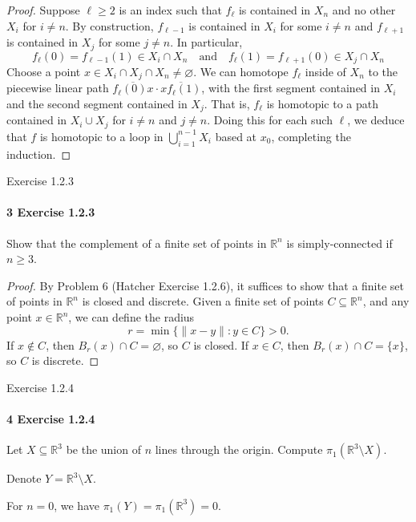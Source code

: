 \documentclass[12pt]{article}
\newlength{\myparskip}
\newenvironment{fullbox}{\begin{lrbox}{\savefullbox}\begin{minipage}{\dimexpr\textwidth-2\fboxsep\relax}\setlength{\parskip}{\myparskip}}{\end{minipage}\end{lrbox}\framebox[\textwidth]{\usebox{\savefullbox}}}
\newenvironment{pbox}[1][]{\begin{fullbox}\ifx#1\empty\else\paragraph{#1}\phantom{}\fi}{\end{fullbox}}
\theoremstyle{definition}
\newcommand{\isp}[1]{\quad\text{#1}\quad}
\newcommand{\R}{\mathbb{R}}
\renewcommand{\emptyset}{\varnothing}
\newcommand{\<}{\langle}
\renewcommand{\>}{\rangle}
\newcommand{\seq}{\subseteq}
\newcommand{\ovl}{\overline}
\begin{document}
\begin{proof}
    Suppose $\ell \geq 2$ is an index such that $f_\ell$ is contained in $X_n$ and no other $X_i$ for $i \ne n$.
    By construction, $f_{\ell-1}$ is contained in $X_i$ for some $i \ne n$ and $f_{\ell+1}$ is contained in $X_j$ for some $j \ne n$.
    In particular,
    \[
        f_\ell(0) = f_{\ell-1}(1) \in X_i \cap X_n \isp{and} f_\ell(1) = f_{\ell+1}(0) \in X_j \cap X_n
    \]
    Choose a point $x \in X_i \cap X_j \cap X_n \ne \emptyset$.
    We can homotope $f_\ell$ inside of $X_n$ to the piecewise linear path $\ovl{f_\ell(0) x} \cdot \ovl{x f_\ell(1)}$, with the first segment contained in $X_i$ and the second segment contained in $X_j$.
    That is, $f_\ell$ is homotopic to a path contained in $X_i \cup X_j$ for $i \ne n$ and $j \ne n$.
    Doing this for each such $\ell$, we deduce that $f$ is homotopic to a loop in $\bigcup_{i=1}^{n-1} X_i$ based at $x_0$, completing the induction.
\end{proof}


\begin{pbox}[3 Exercise 1.2.3]
    Show that the complement of a finite set of points in $\R^n$ is simply-connected if $n \geq 3$.
\end{pbox}

\begin{proof}
    By Problem 6 (Hatcher Exercise 1.2.6), it suffices to show that a finite set of points in $\R^n$ is closed and discrete. 
    Given a finite set of points $C \seq \R^n$, and any point $x \in \R^n$, we can define the radius
    \[
        r = \min\{\|x - y\| : y \in C\} > 0.
    \]
    If $x \notin C$, then $B_r(x) \cap C = \emptyset$, so $C$ is closed.
    If $x \in C$, then $B_r(x) \cap C = \{x\}$, so $C$ is discrete.
\end{proof}

\begin{pbox}[4 Exercise 1.2.4]
    Let $X \seq \R^3$ be the union of $n$ lines through the origin.
    Compute $\pi_1(\R^3 \setminus X)$.
\end{pbox}

Denote $Y = \R^3 \setminus X$.

For $n = 0$, we have $\pi_1(Y) = \pi_1(\R^3) = 0$.
\end{document}
